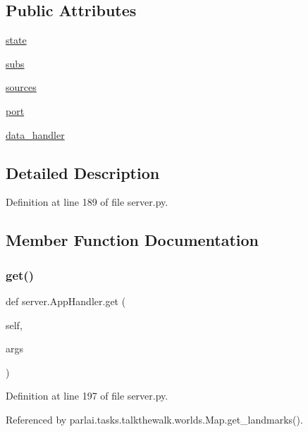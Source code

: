 \subsection*{Public Attributes}
\begin{DoxyCompactItemize}
\item 
\hyperlink{classserver_1_1AppHandler_a0d2ee6ab47de1189bc8d4f958e182119}{state}
\item 
\hyperlink{classserver_1_1AppHandler_a27d0c3562206305f6ef888763224f3e6}{subs}
\item 
\hyperlink{classserver_1_1AppHandler_a6bc198c0db14c674bb6350505fdd6285}{sources}
\item 
\hyperlink{classserver_1_1AppHandler_ae803a72362eafb0cbfae8711a42496e8}{port}
\item 
\hyperlink{classserver_1_1AppHandler_abccb1083b9526b6c38970b1db777f254}{data\+\_\+handler}
\end{DoxyCompactItemize}


\subsection{Detailed Description}


Definition at line 189 of file server.\+py.



\subsection{Member Function Documentation}
\mbox{\label{classserver_1_1AppHandler_a3e2f211ff577b8b4173e0d944c62d87f}} 
\subsubsection{\texorpdfstring{get()}{get()}}
{\footnotesize\ttfamily def server.\+App\+Handler.\+get (\begin{DoxyParamCaption}\item[{}]{self,  }\item[{}]{args }\end{DoxyParamCaption})}



Definition at line 197 of file server.\+py.



Referenced by parlai.\+tasks.\+talkthewalk.\+worlds.\+Map.\+get\+\_\+landmarks().

